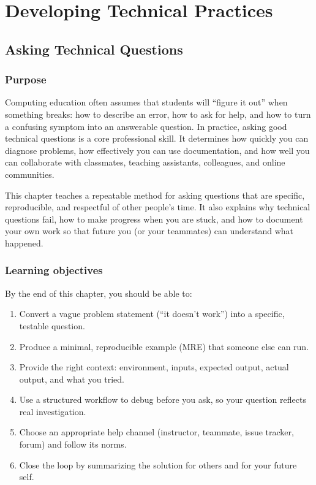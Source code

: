 \part{Developing Technical Practices}
\chapter{Asking Technical Questions}
\label{ch:asking-questions}

\section*{Purpose}
Computing education often assumes that students will ``figure it out'' when something breaks: how to describe an error, how to ask for help, and how to turn a confusing symptom into an answerable question. In practice, asking good technical questions is a core professional skill. It determines how quickly you can diagnose problems, how effectively you can use documentation, and how well you can collaborate with classmates, teaching assistants, colleagues, and online communities.

This chapter teaches a repeatable method for asking questions that are specific, reproducible, and respectful of other people's time. It also explains why technical questions fail, how to make progress when you are stuck, and how to document your own work so that future you (or your teammates) can understand what happened.

\section*{Learning objectives}
By the end of this chapter, you should be able to:
\begin{enumerate}[noitemsep]
  \item Convert a vague problem statement (``it doesn't work'') into a specific, testable question.
  \item Produce a minimal, reproducible example (MRE) that someone else can run.
  \item Provide the right context: environment, inputs, expected output, actual output, and what you tried.
  \item Use a structured workflow to debug before you ask, so your question reflects real investigation.
  \item Choose an appropriate help channel (instructor, teammate, issue tracker, forum) and follow its norms.
  \item Close the loop by summarizing the solution for others and for your future self.
\end{enumerate}

